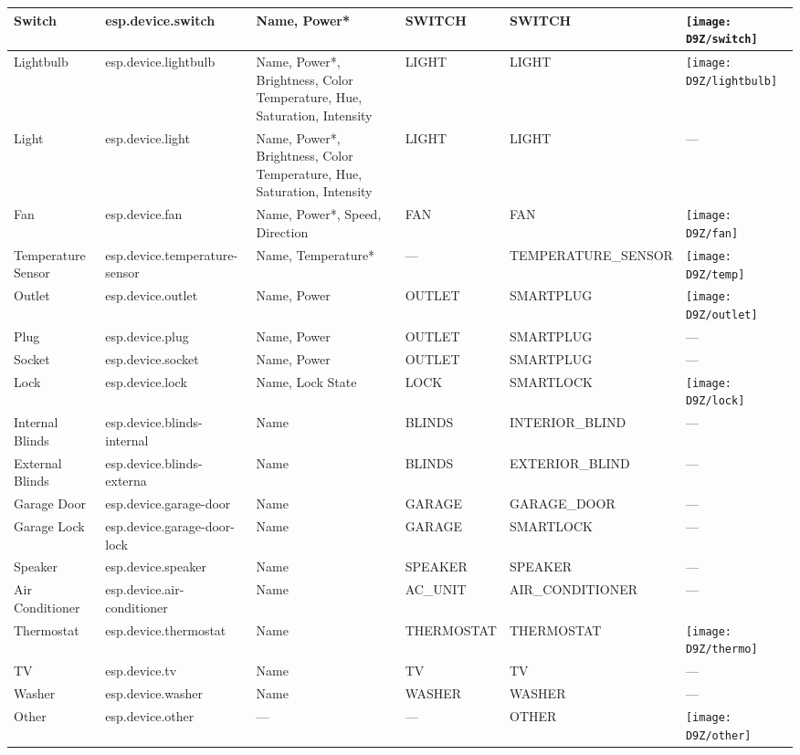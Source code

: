 \documentclass[a4paper,12pt]{book}
\begin{document}
\begin{enumerate}[label=\textbf{(\arabic*)}]
{\begin{longtable}{|>{\RaggedRight}m{}|m{}|>{\RaggedRight}m{}|m{}|m{}|>{\Centering}m{}|}
        Switch&esp.device.switch&Name, Power*&SWITCH&SWITCH&\texttt{[image: D9Z/switch]}\\
        \hline
        Lightbulb&esp.device.lightbulb&Name, Power*, Brightness, Color Temperature, Hue, Saturation, Intensity&LIGHT&LIGHT&\texttt{[image: D9Z/lightbulb]}\\
        \hline
        Light&esp.device.light&Name, Power*, Brightness, Color Temperature, Hue, Saturation, Intensity&LIGHT&LIGHT&—\\
        \hline
        Fan&esp.device.fan&Name, Power*, Speed, Direction&FAN&FAN&\texttt{[image: D9Z/fan]}\\
        \hline
        Temperature Sensor&esp.device.temperature-sensor&Name, Temperature*&—&TEMPERATURE\_SENSOR&\texttt{[image: D9Z/temp]}\\
        \hline
        Outlet&esp.device.outlet&Name, Power&OUTLET&SMARTPLUG&\texttt{[image: D9Z/outlet]}\\
        \hline
        Plug&esp.device.plug&Name, Power&OUTLET&SMARTPLUG&—\\
        \hline
        Socket&esp.device.socket&Name, Power&OUTLET&SMARTPLUG&—\\
        \hline
        Lock&esp.device.lock&Name, Lock State&LOCK&SMARTLOCK&\texttt{[image: D9Z/lock]}\\
        \hline
        Internal Blinds&esp.device.blinds-internal&Name&BLINDS&INTERIOR\_BLIND&—\\
        \hline
        External Blinds&esp.device.blinds-externa&Name&BLINDS&EXTERIOR\_BLIND&—\\
        \hline
        Garage Door&esp.device.garage-door&Name&GARAGE&GARAGE\_DOOR&—\\
        \hline
        Garage Lock&esp.device.garage-door-lock&Name&GARAGE&SMARTLOCK&—\\
        \hline
        Speaker&esp.device.speaker&Name&SPEAKER&SPEAKER&—\\
        \hline
        Air \newline Conditioner&esp.device.air-conditioner&Name&AC\_UNIT&AIR\_CONDITIONER&—\\
        \hline
        Thermostat&esp.device.thermostat&Name&THERMOSTAT&THERMOSTAT&\texttt{[image: D9Z/thermo]}\\
        \hline
        TV&esp.device.tv&Name&TV&TV&—\\
        \hline
        Washer&esp.device.washer&Name&WASHER&WASHER&—\\
        \hline
        Other&esp.device.other&—&—&OTHER&\texttt{[image: D9Z/other]}\\
        \hline
    \end{longtable}
    }


\end{enumerate}
\end{document}
